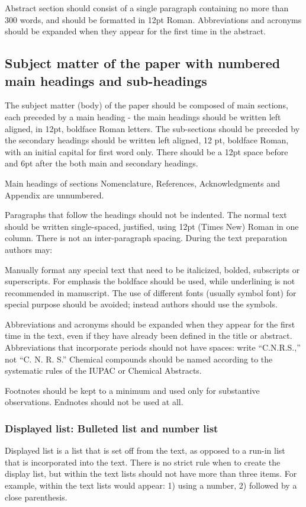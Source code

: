 \documentclass{ECOS_2021}
\begin{document}
Abstract section should consist of a single paragraph containing no more than 300 words, and should be formatted in 12pt Roman. Abbreviations and acronyms should be expanded when they appear for the first time in the abstract.

\sffamily \large \subsection{Subject matter of the paper with numbered main headings and sub-headings} \label{Subject}
\rmfamily \normalsize
The subject matter (body) of the paper should be composed of main sections, each preceded by a main heading - the main headings should be written left aligned, in 12pt, boldface Roman letters. The sub-sections should be preceded by the secondary headings should be written left aligned, 12 pt, boldface Roman, with an initial capital for first word only. There should be a 12pt space before and 6pt after the both main and secondary headings.

Main headings of sections Nomenclature, References, Acknowledgments and Appendix are unnumbered.

Paragraphs that follow the headings should not be indented. The normal text should be written single-spaced, justified, using 12pt (Times New) Roman in one column. There is not an inter-paragraph spacing. During the text preparation authors may:

Manually format any special text that need to be italicized, bolded, subscripts or superscripts. For emphasis the boldface should be used, while underlining is not recommended in manuscript. The use of different fonts (usually symbol font) for special purpose should be avoided; instead authors should use the symbols.

Abbreviations and acronyms should be expanded when they appear for the first time in the text, even if they have already been defined in the title or abstract. Abbreviations that incorporate periods should not have spaces: write ``C.N.R.S.,'' not ``C. N. R. S.'' Chemical compounds should be named according to the systematic rules of the IUPAC or Chemical Abstracts.

Footnotes should be kept to a minimum and used only for substantive observations. Endnotes should not be used at all.

\sffamily \subsubsection{Displayed list: Bulleted list and number list} \label{List}
\rmfamily
Displayed list is a list that is set off from the text, as opposed to a run-in list that is incorporated into the text. There is no strict rule when to create the display list, but within the text lists should not have more than three items. For example, within the text lists would appear: 1) using a number, 2) followed by a close parenthesis.
\end{document}
